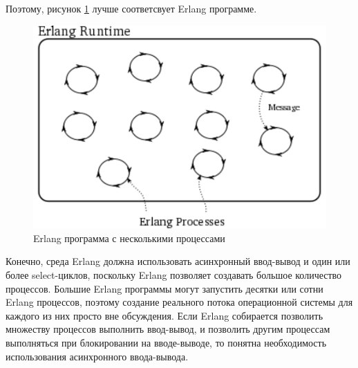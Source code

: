 Поэтому, рисунок \ref{fig:erlang-2} лучше соответсвует Erlang программе.

\begin{figure}[h]
\begin{center}
    \includegraphics[height=0.3\textheight]{images/erlang-2.pdf}
    \caption{Erlang программа с несколькими процессами\label{fig:erlang-2}}
\end{center}
\end{figure}

Конечно, среда Erlang должна использовать асинхронный ввод-вывод и 
один или более select-циклов, поскольку Erlang позволяет создавать 
большое количество процессов. Большие Erlang программы могут 
запустить десятки или сотни Erlang процессов, поэтому создание 
реального потока операционной системы для каждого из них просто вне 
обсуждения. Если Erlang собирается позволить множеству процессов 
выполнить ввод-вывод, и позволить другим процессам выполняться при блокировании 
на вводе-выводе, то понятна необходимость использования асинхронного 
ввода-вывода.

